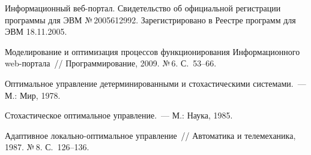 \begin{multicols}{2}
{{\begin{thebibliography}{9}
Информационный веб-пор\-тал. Свидетельство об официальной регистрации программы для 
ЭВМ №\,2005612992. Зарегистрировано в Реестре программ для ЭВМ 18.11.2005.

Моделирование и оптимизация процессов функционирования Информационного 
web-пор\-та\-ла~// Программирование, 2009. №\,6. С.~53--66.


Оптимальное управление детерминированными и стохастическими системами.~--- М.: Мир, 
1978.

Стохастическое оптимальное управление.~--- М.: Наука, 1985.

\label{end\stat}

Адаптивное ло\-каль\-но-опти\-маль\-ное управ\-ле\-ние~// Автоматика и телемеханика, 1987. 
№\,8. С.~126--136.

  
 \end{thebibliography}
}
}


\end{multicols}